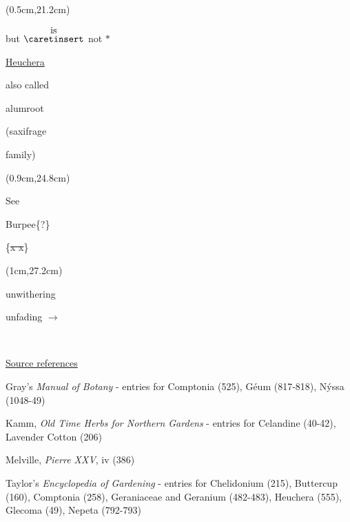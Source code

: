 \documentclass[a4paper,10pt]{article}
\begin{document}
\color{red}
\begin{textblock*}{5cm}(0.5cm,21.2cm)%
    \small
    \begin{minipage}{5cm} 
        \color{red}
        but $\stackrel{\hbox{is}}{\hbox{$\caretinsert$}}$ not $\ast$\par
        \ul{Heuchera}\par
        also called\par
         alumroot\par
        (saxifrage\par
        family)
        \normalsize
    \end{minipage}%
\end{textblock*}%

\begin{textblock*}{2in}(0.9cm,24.8cm)%
    \small
    \begin{minipage}{2in} 
        \color{blue}
        See\par
        Burpee\{?\}\par
        \color{red}
        \{\sout{x x}\}\par
        \normalsize
    \end{minipage}%
\end{textblock*}%

\color{red}
\begin{textblock*}{5cm}(1cm,27.2cm)%
    \small
    \begin{minipage}{5cm} 
        \color{red}
        unwithering\par
        unfading $\rightarrow$
        \normalsize
    \end{minipage}%
\end{textblock*}\leavevmode
\\[0.5in]
\setlength{\parskip}{15pt}
\color{black}
\noindent\makebox[\linewidth]{\rule{\paperwidth}{0.4pt}}
\large
{\selectfont
{}
\begin{center}
\center\ul{Source references}
\end{center}
\normalsize
\begin{hangparas}{2em}{1}
    Gray's \textit{Manual of Botany} - entries for Comptonia (525), Géum (817-818), Nýssa (1048-49)\par
    Kamm, \textit{Old Time Herbs for Northern Gardens} - entries for Celandine (40-42), Lavender Cotton (206)\par
    Melville, \textit{Pierre XXV}, iv (386)\par
    Taylor's \textit{Encyclopedia of Gardening} - entries for Chelidonium (215), Buttercup (160), Comptonia (258), Geraniaceae and Geranium (482-483), Heuchera (555), Glecoma (49), Nepeta (792-793)\par 
\end{hangparas}
}
\end{document}
